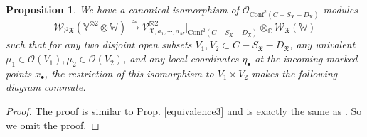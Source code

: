 \documentclass[11pt,b5paper,notitlepage]{article}
\theoremstyle{definition}
\theoremstyle{plain}
\newtheorem{pp}[df]{Proposition}
\newcommand{\Conf}{\mathrm{Conf}}
\newcommand{\SV}{\mathscr{V}}
\newcommand{\blt}{\bullet}
\newcommand{\Vbb}{\mathbb V}
\newcommand{\Wbb}{\mathbb W}
\newcommand{\Cbb}{\mathbb C}
\newcommand{\pr}{\mathrm {pr}}
\newcommand{\<}{\left\langle}
\renewcommand{\>}{\right\rangle}
\newcommand{\MO}{\mathcal{O}}
\newcommand{\fx}{\mathfrak{X}}
\newcommand{\SW}{\mathscr{W}}
\numberwithin{equation}{section}
\begin{document}
\begin{pp}\label{equivalence4}
    We have a canonical isomorphism of $\MO_{\Conf^2(C-S_\fx-D_\fx)}$-modules
    $$
    \SW_{\wr^2\fx}(\Vbb^{\otimes 2}\otimes \Wbb)\xrightarrow{\simeq} \SV_{\fx,a_1,\cdots,a_M}^{\boxtimes 2}\vert_{\Conf^2(C-S_\fx-D_\fx)}\otimes_\Cbb \SW_\fx(\Wbb)
    $$
    such that for any two disjoint open subsets $V_1,V_2\subset C-S_\fx-D_\fx$, any univalent $\mu_1\in \MO(V_1),\mu_2\in \MO(V_2)$, and any local coordinates $\eta_\blt$ at the incoming marked points $x_\blt$, the restriction of this isomorphism to $V_1\times V_2$ makes the following diagram commute.
    \begin{center}
\end{center}
\end{pp}
\begin{proof}
    The proof is similar to Prop. \ref{equivalence3} and is exactly the same as \cite[Prop. 8.1]{Gui-propagation}. So we omit the proof.  %
\end{proof}
\end{document}
